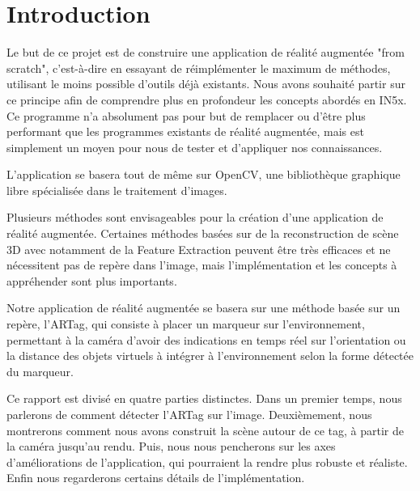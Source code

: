 \part*{Introduction}

Le but de ce projet est de construire une application de réalité augmentée "from scratch", c'est-à-dire en essayant de réimplémenter le maximum de méthodes, utilisant le moins possible d'outils déjà existants. Nous avons souhaité partir sur ce principe afin de comprendre plus en profondeur les concepts abordés en IN5x. Ce programme n'a absolument pas pour but de remplacer ou d'être plus performant que les programmes existants de réalité augmentée, mais est simplement un moyen pour nous de tester et d'appliquer nos connaissances.

L'application se basera tout de même sur OpenCV, une bibliothèque graphique libre spécialisée dans le traitement d'images.

Plusieurs méthodes sont envisageables pour la création d'une application de réalité augmentée. Certaines méthodes basées sur de la reconstruction de scène 3D avec notamment de la Feature Extraction peuvent être très efficaces et ne nécessitent pas de repère dans l'image, mais l'implémentation et les concepts à appréhender sont plus importants.

Notre application de réalité augmentée se basera sur une méthode basée sur un repère, l'ARTag, qui consiste à placer un marqueur sur l'environnement, permettant à la caméra d'avoir des indications en temps réel sur l'orientation ou la distance des objets virtuels à intégrer à l'environnement selon la forme détectée du marqueur. 

Ce rapport est divisé en quatre parties distinctes. Dans un premier temps, nous parlerons de comment détecter l'ARTag sur l'image. Deuxièmement, nous montrerons comment nous avons construit la scène autour de ce tag, à partir de la caméra jusqu'au rendu. Puis, nous nous pencherons sur les axes d'améliorations de l'application, qui pourraient la rendre plus robuste et réaliste. Enfin nous regarderons certains détails de l'implémentation.